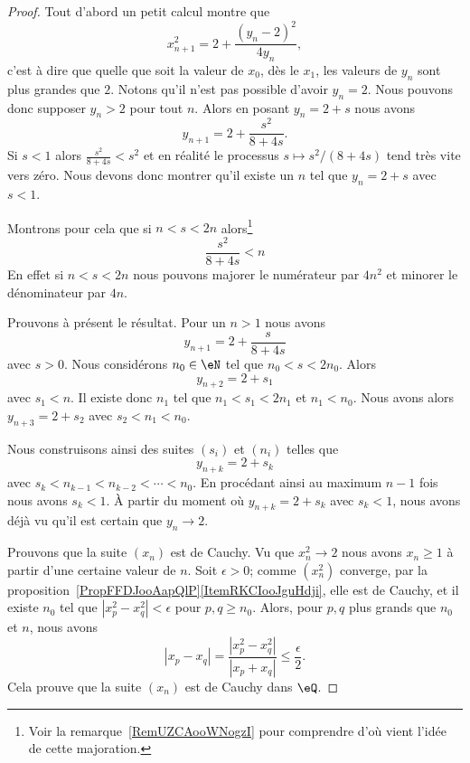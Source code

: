 \begin{proof}
    Tout d'abord un petit calcul montre que
    \begin{equation}
        x_{n+1}^2=2+\frac{ (y_n-2)^2 }{ 4y_n },
    \end{equation}
    c'est à dire que quelle que soit la valeur de \( x_0\), dès le \( x_1\), les valeurs de \( y_n\) sont plus grandes que \( 2\). Notons qu'il n'est pas possible d'avoir \( y_n=2\). Nous pouvons donc supposer \( y_n>2\) pour tout \( n\). Alors en posant \( y_n=2+s\) nous avons
    \begin{equation}
        y_{n+1}=2+\frac{ s^2 }{ 8+4s }.
    \end{equation}
    Si \( s<1\) alors \( \frac{ s^2 }{ 8+4s }<s^2\) et en réalité le processus \( s\mapsto s^2/(8+4s)\) tend très vite vers zéro. Nous devons donc montrer qu'il existe un \( n\) tel que \( y_n=2+s\) avec \( s<1\).

    Montrons pour cela que si \( n<s<2n\) alors\footnote{Voir la remarque~\ref{RemUZCAooWNogzI} pour comprendre d'où vient l'idée de cette majoration.}
    \begin{equation}\label{EqYNKQooUBfhgz}
        \frac{ s^2 }{ 8+4s }<n
    \end{equation}
    En effet si \( n<s<2n\) nous pouvons majorer le numérateur par \( 4n^2\) et minorer le dénominateur par \( 4n\).

    Prouvons à présent le résultat. Pour un \( n>1\) nous avons
    \begin{equation}
        y_{n+1}=2+\frac{ s }{ 8+4s }
    \end{equation}
    avec \( s>0\). Nous considérons \( n_0\in \eN\) tel que \( n_0<s<2n_0\). Alors
    \begin{equation}
        y_{n+2}=2+s_1
    \end{equation}
    avec \( s_1<n\). Il existe donc \( n_1\) tel que \( n_1<s_1<2n_1\) et \( n_1<n_0\). Nous avons alors \( y_{n+3}=2+s_2\) avec \( s_2<n_1<n_0\).

    Nous construisons ainsi des suites \( (s_i)\) et \( (n_i)\) telles que
    \begin{equation}
        y_{n+k}=2+s_k
    \end{equation}
    avec \( s_k<n_{k-1}<n_{k-2}<\cdots<n_0\). En procédant ainsi au maximum \( n-1\) fois nous avons \( s_k<1\). À partir du moment où \( y_{n+k}=2+s_k\) avec \( s_k<1\), nous avons déjà vu qu'il est certain que \( y_n\to 2\).

    Prouvons que la suite \( (x_n)\) est de Cauchy. Vu que \( x_n^2\to 2\) nous avons \( x_n\geq 1\) à partir d'une certaine valeur de \( n\). Soit \( \epsilon > 0 \); comme \( (x_n^2)\) converge, par la proposition~\ref{PropFFDJooAapQlP}\ref{ItemRKCIooJguHdji}, elle est de Cauchy, et il existe \( n_0\) tel que \( | x_p^2-x_q^2 | < \epsilon \) pour \( p,q\geq n_0\). Alors, pour \( p,q \) plus grands que \( n_0\) et \( n\), nous avons
    \begin{equation}
        |x_p-x_q | = \frac{| x_p^2-x_q^2 |}{| x_p+x_q |} \leq \frac \epsilon 2.
    \end{equation}
    Cela prouve que la suite \( (x_n)\) est de Cauchy dans \( \eQ\).


\end{proof}
